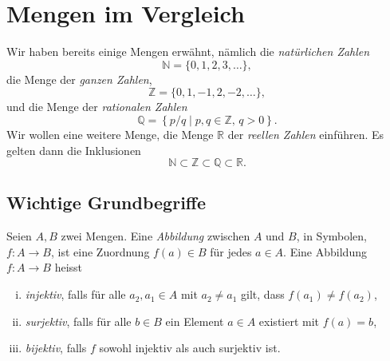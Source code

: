 \documentclass[../main.tex]{subfiles}
\begin{document}
\section{Mengen im Vergleich}
Wir haben bereits einige Mengen erwähnt, nämlich die \textit{natürlichen Zahlen}
\[ \mathbb N = \{0, 1, 2, 3, \dots\},\]
die Menge der \textit{ganzen Zahlen},
\[ \mathbb Z = \{0, 1, -1, 2, -2, \dots\},\]
und die Menge der \textit{rationalen Zahlen}
\[ \mathbb Q = \left\{p/q \mid p, q \in \mathbb Z, \, q > 0\right\}.\]
Wir wollen eine weitere Menge, die Menge $\mathbb R$ der \textit{reellen Zahlen}
einführen. Es gelten dann die Inklusionen
\[\mathbb N \subset \mathbb Z \subset \mathbb Q \subset \mathbb R.\]

\subsection*{Wichtige Grundbegriffe}
\begin{definition}
  Seien $A, B$ zwei Mengen.
  Eine \textit{Abbildung} zwischen $A$ und $B$,
  in Symbolen, $f \colon A \to B$, ist eine Zuordnung
  $f(a) \in B$ für jedes $a \in A$.
  Eine Abbildung $f \colon A \to B$ heisst
  \begin{enumerate}[(i)]
    \item \textit{injektiv}, falls für alle $a_{2}, a_{1} \in A$
      mit $a_{2} \ne a_{1}$ gilt, dass $f(a_{1}) \neq f(a_{2})$,
    \item \textit{surjektiv}, falls für alle $b \in B$ ein Element
      $a \in A$ existiert mit $f(a) = b$,
      \item \textit{bijektiv}, falls $f$ sowohl injektiv als auch surjektiv ist.
  \end{enumerate}
\end{definition}
\end{document}
